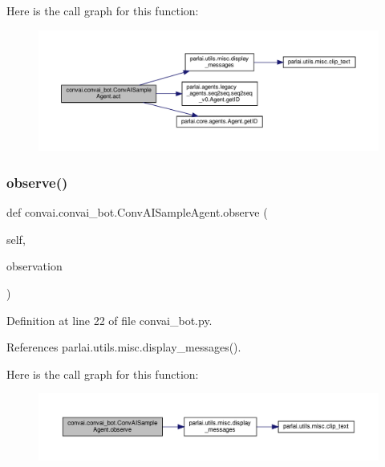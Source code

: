 Here is the call graph for this function\+:
\nopagebreak
\begin{figure}[H]
\begin{center}
\leavevmode
\includegraphics[width=350pt]{classconvai_1_1convai__bot_1_1ConvAISampleAgent_ad8645a69c3fcbefb4863bf9ebbff3d0c_cgraph}
\end{center}
\end{figure}
\mbox{\label{classconvai_1_1convai__bot_1_1ConvAISampleAgent_a03ce86e26b72bb7d39ff9cdb86fa19e7}} 
\subsubsection{\texorpdfstring{observe()}{observe()}}
{\footnotesize\ttfamily def convai.\+convai\+\_\+bot.\+Conv\+A\+I\+Sample\+Agent.\+observe (\begin{DoxyParamCaption}\item[{}]{self,  }\item[{}]{observation }\end{DoxyParamCaption})}



Definition at line 22 of file convai\+\_\+bot.\+py.



References parlai.\+utils.\+misc.\+display\+\_\+messages().

Here is the call graph for this function\+:
\nopagebreak
\begin{figure}[H]
\begin{center}
\leavevmode
\includegraphics[width=350pt]{classconvai_1_1convai__bot_1_1ConvAISampleAgent_a03ce86e26b72bb7d39ff9cdb86fa19e7_cgraph}
\end{center}
\end{figure}


